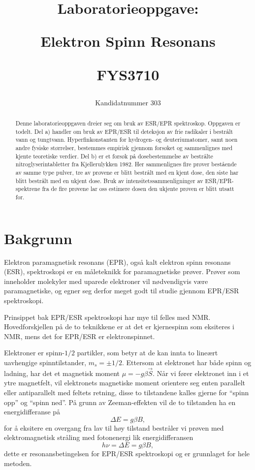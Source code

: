 \documentclass[a4paper, 11pt, notitlepage]{article}
\title{{\centerline{\Huge Laboratorieoppgave:}} \vspace{0.4cm} {\centerline{\Huge Elektron Spinn Resonans}} \vspace{0.4cm} {\centerline{\LARGE FYS3710}}}
\author{Kandidatnummer 303}
\begin{document}
\maketitle


\vspace*{3.5cm}

\begin{abstract}
Denne laboratorieoppgaven dreier seg om bruk av ESR/EPR spektroskop. Oppgaven er todelt. Del a) handler om bruk av EPR/ESR til deteksjon av frie radikaler i bestrålt vann og tungtvann. Hyperfinkonstanten for hydrogen- og deuteriumatomer, samt noen andre fysiske størrelser, bestemmes empirisk gjennom forsøket og sammenlignes med kjente teoretiske verdier. Del b) er et forsøk på dosebestemmelse av bestrålte nitroglyserintabletter fra Kjellerulykken 1982. Her sammenlignes fire prøver bestående av samme type pulver, tre av prøvene er blitt bestrålt med en kjent dose, den siste har blitt bestrålt med en ukjent dose. Bruk av intensitetssammenligninger av ESR/EPR-spektrene fra de fire prøvene lar oss estimere dosen den ukjente prøven er blitt utsatt for.
\end{abstract}

\clearpage

\section{Bakgrunn}
Elektron paramagnetisk resonans (EPR), også kalt elektron spinn resonans (ESR), spektroskopi er en måleteknikk for paramagnetiske prøver. Prøver som inneholder molekyler med uparede elektroner vil nødvendigvis være paramagnetiske, og egner seg derfor meget godt til studie gjennom EPR/ESR spektroskopi.

Prinsippet bak EPR/ESR spektroskopi har mye til felles med NMR. Hovedforskjellen på de to teknikkene er at det er kjernespinn som eksiteres i NMR, mens det for EPR/ESR er elektronspinnet.

Elektroner er spinn-$1/2$ partikler, som betyr at de kan innta to lineært uavhengige spinntilstander, $m_s = \pm 1/2$. Ettersom at elektronet har både spinn og ladning, har det et magnetisk moment $\mu = -g\beta\vec{S}$. Når vi fører elektronet inn i et ytre magnetfelt, vil elektronets magnetiske moment orientere seg enten parallelt eller antiparallelt med feltets retning, disse to tilstandene kalles gjerne for ``spinn opp'' og ``spinn ned''. På grunn av Zeeman-effekten vil de to tilstanden ha en energidifferanse på
$$\Delta E = g\beta B,$$
for å eksitere en overgang fra lav til høy tilstand bestråler vi prøven med elektromagnetisk stråling med fotonenergi lik energidifferansen
$$h\nu = \Delta E = g\beta B,$$
dette er resonansbetingelsen for EPR/ESR spektroskopi og er grunnlaget for hele metoden.
\end{document}

